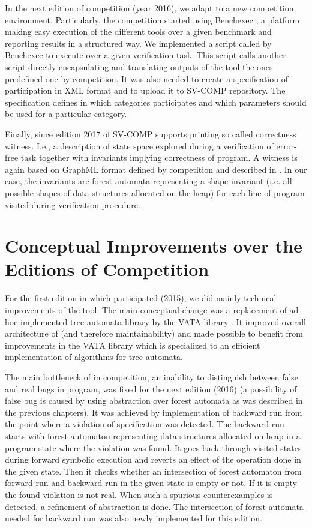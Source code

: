 {In the next edition of competition (year 2016), we adapt \forester to a new competition environment.
Particularly, the competition started using Benchexec \cite{sttt-benchexec}, a platform
making easy execution of the different tools over a given benchmark and reporting results in a structured way.
We implemented a script called by Benchexec to execute \forester over a given 
verification task.
This script calls another script directly encapsulating \forester and translating outputs of the tool the ones
predefined one by competition.
It was also needed to create a specification of participation in XML format and to upload it to SV-COMP repository.
The specification defines in which categories \forester participates and which parameters should be used
for a particular category.

Finally, since edition 2017 of SV-COMP \forester supports printing so called correctness witness.
I.e., a description of state space explored during a verification of error-free task together with
invariants implying correctness of program.
A witness is again based on GraphML format defined by competition and described in \cite{fse16-correct}.
In our case, the invariants are forest automata representing a shape invariant (i.e. all possible shapes of data structures
allocated on the heap) for each line of program visited during verification procedure.

\section{Conceptual Improvements over the Editions of Competition}
For the first edition in which \forester participated (2015), we did mainly technical improvements of the tool.
The main conceptual change was a replacement of ad-hoc implemented tree automata library by the VATA library \cite{libvata}.
It improved overall architecture of \forester (and therefore maintainability) and made possible
to benefit from improvements in the VATA library which is specialized to an efficient implementation of
algorithms for tree automata.

The main bottleneck of \forester in competition, an inability to distinguish between false and real bugs in program,
was fixed for the next edition (2016) (a possibility of false bug is caused by using abstraction over forest
automata as was described in the previous chapters).
It was achieved by implementation of backward run from the point where a violation of specification was detected.
The backward run starts with forest automaton representing data structures allocated on heap in a program state where the violation was found.
It goes back through visited states during forward symbolic execution and reverts an effect of the operation done
in the given state.
Then it checks whether an intersection of forest automaton from forward run and backward run in the given state is empty or not.
If it is empty the found violation is not real.
When such a spurious counterexamples is detected, a refinement of abstraction is done.
The intersection of forest automata needed for backward run was also newly implemented for this edition.

}
